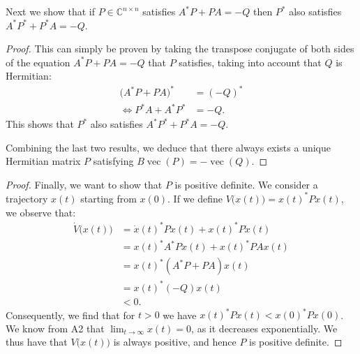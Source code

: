 \documentclass[11pt]{article}
\DeclareMathOperator{\vect}{vec}
\newcommand{\complex}{\mathbb{C}} %
\begin{document}
Next we show that if $P\in\complex^{n\times n}$ satisfies $A^*P+PA=-Q$ then $P^*$ also satisfies $A^*P^*+P^*A=-Q$.
\begin{proof}
This can simply be proven by taking the transpose conjugate of both sides of the equation $A^*P+PA=-Q$ that \(P\) satisfies, taking into account that \(Q\) is Hermitian:
\begin{align*}
    \big(A^*P+PA\big)^*&=(-Q)^*\\
    \iff P^*A+A^*P^*&=-Q.
\end{align*}
This shows that $P^*$ also satisfies $A^*P^*+P^*A=-Q$.

Combining the last two results, we deduce that there always exists a unique Hermitian matrix $P$ satisfying $B\vect(P)=-\vect(Q)$.
\end{proof}

\begin{proof}
Finally, we want to show that $P$ is positive definite. We consider a trajectory $x(t)$ starting from $x(0)$. If we define $V\big(x(t)\big)=x(t)^*Px(t)$, we observe that:
\begin{align*}
    \dot{V}\big(x(t)\big)&=\dot{x}(t)^*P x(t)+x(t)^*P\dot{x}(t)\\
    &=x(t)^*A^*P x(t)+x(t)^*P A x(t)\\
    &=x(t)^*(A^*P+P A) x(t)\\
    &=x(t)^*(-Q) x(t)\\
    &< 0.
\end{align*}
Consequently, we find that for $t>0$ we have $x(t)^*P x(t) < x(0)^*P x(0)$.
We know from A2 that \(\lim_{t \to \infty} x(t) = 0\), as it decreases exponentially.
We thus have that \(V\big(x(t)\big)\) is always positive, and hence \(P\) is positive definite.
\end{proof}
\end{document}
